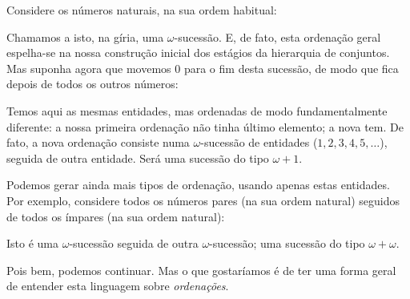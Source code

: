 \documentclass[../../../include/open-logic-section]{subfiles}
\begin{document}

Considere os números naturais, na sua ordem habitual:
\begin{center}
\end{center}
Chamamos a isto, na gíria, uma $\omega$-sucessão. E, de fato, esta
ordenação geral espelha-se na nossa construção inicial dos estágios
da hierarquia de conjuntos. Mas suponha agora que movemos $0$ para o fim desta
sucessão, de modo que fica depois de todos os outros números:
\begin{center}
\end{center}
Temos aqui as mesmas entidades, mas ordenadas de modo fundamentalmente
diferente: a nossa primeira ordenação não tinha último elemento; a nova
tem. De fato, a nova ordenação consiste numa
$\omega$-sucessão de entidades ($1, 2, 3, 4, 5, \ldots$), seguida de
outra entidade. Será uma sucessão do tipo $\omega+1$.

Podemos gerar ainda mais tipos de ordenação, usando apenas estas
entidades. Por exemplo, considere todos os números pares (na sua ordem natural)
seguidos de todos os ímpares (na sua ordem natural):
\begin{center}
\end{center}
Isto é uma $\omega$-sucessão seguida de outra $\omega$-sucessão; uma
sucessão do tipo $\omega+\omega$. 

Pois bem, podemos continuar. Mas o que gostaríamos é de ter uma forma geral de
entender esta linguagem sobre \emph{ordenações}. 
\end{document}
